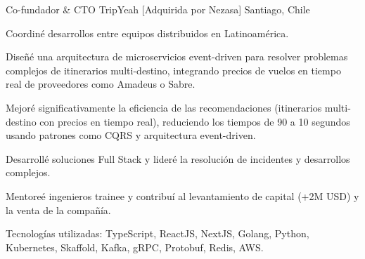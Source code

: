 \begin{cventries}
  \cventry
    {Co-fundador \& CTO} %
    {TripYeah [Adquirida por Nezasa]} %
    {Santiago, Chile} %
    {} %
    {
      \begin{cvitems} %
        \item {Coordiné desarrollos entre equipos distribuidos en Latinoamérica.}
        \item {Diseñé una arquitectura de microservicios event-driven para resolver problemas complejos de itinerarios multi-destino, integrando precios de vuelos en tiempo real de proveedores como Amadeus o Sabre.}
        \item {Mejoré significativamente la eficiencia de las recomendaciones (itinerarios multi-destino con precios en tiempo real), reduciendo los tiempos de 90 a 10 segundos usando patrones como CQRS y arquitectura event-driven.}
        \item {Desarrollé soluciones Full Stack y lideré la resolución de incidentes y desarrollos complejos.}
        \item {Mentoreé ingenieros trainee y contribuí al levantamiento de capital (+2M USD) y la venta de la compañía.}
        \item {Tecnologías utilizadas: TypeScript, ReactJS, NextJS, Golang, Python, Kubernetes, Skaffold, Kafka, gRPC, Protobuf, Redis, AWS.}
      \end{cvitems}
    }
\end{cventries}
\newpage
